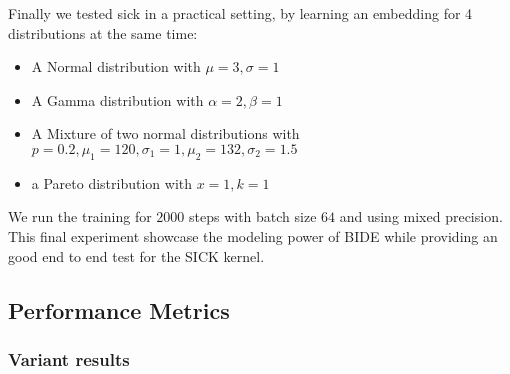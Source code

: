\documentclass{article}
\begin{document}
Finally we tested sick in a practical setting, by learning an embedding for 4 distributions at the same time:
\begin{itemize}
    \item A Normal distribution with $\mu=3, \sigma=1$
    \item A Gamma distribution with $\alpha=2, \beta=1$
    \item A Mixture of two normal distributions with $p=0.2, \mu_1=120, \sigma_1=1, \mu_2=132, \sigma_2=1.5$ 
    \item a Pareto distribution with $x=1, k=1$
\end{itemize}
We run the training for $2000$ steps with batch size $64$ and using mixed precision.
This final experiment showcase the modeling power of BIDE while providing an good end to end test for the SICK kernel.

\subsection{Performance Metrics}

\subsubsection{Variant results}
\end{document}
